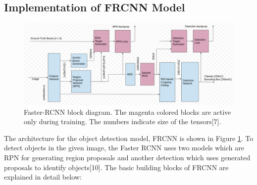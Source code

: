 \documentclass[12pt]{article}
\begin{document}
\subsection{Implementation of FRCNN Model}
\label{sec:FRCNN_impl}
\begin{figure}[H]
\centering
  \includegraphics[width=\linewidth]{./Images/FRCNN_model.png}
  \caption{Faster-RCNN block diagram. The magenta colored blocks are active only during training. The numbers indicate size of the tensors[7].}
  \label{fig:FRCNN_model}
\end{figure}


The architecture for the object detection model, FRCNN is shown in Figure \ref{fig:FRCNN_model}. To detect objects in the given image, the Faster RCNN uses two models which are RPN for generating region proposals and another detection which uses generated proposals to identify objects[10]. The basic building blocks of FRCNN are explained in detail below: \\
\end{document}
